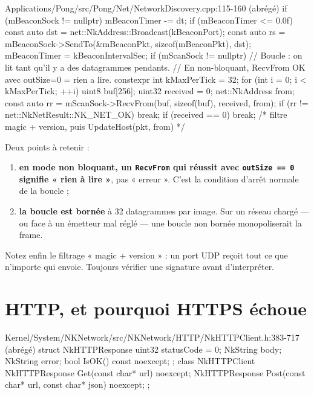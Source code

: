 \begin{nkcode}{Applications/Pong/src/Pong/Net/NetworkDiscovery.cpp:115-160 (abrégé)}
            if (mBeaconSock != nullptr) {
                mBeaconTimer -= dt;
                if (mBeaconTimer <= 0.0f) {
                    const auto dst = net::NkAddress::Broadcast(kBeaconPort);
                    const auto rs = mBeaconSock->SendTo(&mBeaconPkt, sizeof(mBeaconPkt), dst);
                    mBeaconTimer = kBeaconIntervalSec;
                }
            }
            if (mScanSock != nullptr) {
                // Boucle : on lit tant qu'il y a des datagrammes pendants.
                // En non-bloquant, RecvFrom OK avec outSize=0 = rien a lire.
                constexpr int kMaxPerTick = 32;
                for (int i = 0; i < kMaxPerTick; ++i) {
                    uint8 buf[256];
                    uint32 received = 0;
                    net::NkAddress from;
                    const auto rr = mScanSock->RecvFrom(buf, sizeof(buf), received, from);
                    if (rr != net::NkNetResult::NK_NET_OK) break;
                    if (received == 0) break;
                    /* filtre magic + version, puis UpdateHost(pkt, from) */
                }
            }
\end{nkcode}

Deux points à retenir :

\begin{enumerate}
  \item \textbf{en mode non bloquant, un \texttt{RecvFrom} qui réussit avec
        \texttt{outSize == 0} signifie « rien à lire »}, pas « erreur ». C'est
        la condition d'arrêt normale de la boucle ;
  \item \textbf{la boucle est bornée} à 32 datagrammes par image. Sur un réseau
        chargé — ou face à un émetteur mal réglé — une boucle non bornée
        monopoliserait la frame.
\end{enumerate}

Notez enfin le filtrage « magic + version » : un port UDP reçoit tout ce que
n'importe qui envoie. Toujours vérifier une signature avant d'interpréter.

\section{HTTP, et pourquoi HTTPS échoue}

\begin{nkcode}{Kernel/System/NKNetwork/src/NKNetwork/HTTP/NkHTTPClient.h:383-717 (abrégé)}
struct NkHTTPResponse {
        uint32 statusCode = 0;
        NkString body;
        NkString error;
        bool IsOK() const noexcept;
};
class NkHTTPClient {
        NkHTTPResponse Get(const char* url) noexcept;
        NkHTTPResponse Post(const char* url, const char* json) noexcept;
};
\end{nkcode}

